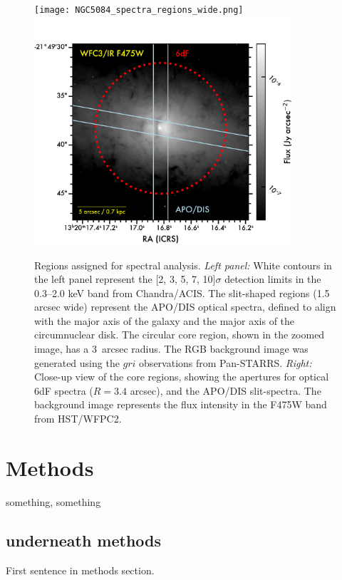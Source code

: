 \documentclass[modern]{CORE-AAS/aastex631}
\begin{document}
{\begin{figure}[t!]
\begin{center}
\texttt{[image: NGC5084\_spectra\_regions\_wide.png]}\includegraphics[trim={0 0 0 0}, clip, height=8.5cm]{NGC5084_regions_core.png}
\caption{Regions assigned for spectral analysis. \emph{Left panel:} White contours in the left panel represent the [2, 3, 5, 7, 10]$\sigma$ detection limits in the 0.3--2.0 keV band from Chandra/ACIS. The slit-shaped regions (1.5 arcsec wide) represent the APO/DIS optical spectra, defined to align with the major axis of the galaxy and the major axis of the circumnuclear disk. The circular core region, shown in the zoomed image, has a 3~arcsec radius. The RGB background image was generated using the $gri$ observations from Pan-STARRS. \emph{Right:} Close-up view of the core regions, showing the apertures for optical 6dF spectra ($R=3.4$ arcsec), and the APO/DIS slit-spectra. The background image represents the flux intensity in the F475W band from HST/WFPC2.} 
\label{fig:NGC5084_spectra_regions}
\end{center}
\end{figure}

\section{Methods}
\label{sec:methods}

something, something

\subsection{underneath methods}

First sentence in methods section. 


}
\end{document}
